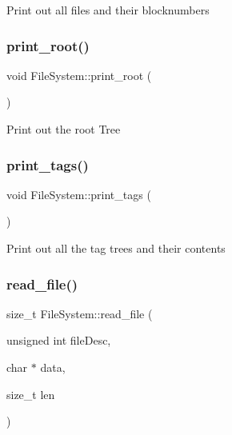 Print out all files and their blocknumbers \mbox{\label{class_file_system_a8ec00d561e8d7510358618b249cc60d1}} 
\subsubsection{\texorpdfstring{print\+\_\+root()}{print\_root()}}
{\footnotesize\ttfamily void File\+System\+::print\+\_\+root (\begin{DoxyParamCaption}{ }\end{DoxyParamCaption})}

Print out the root Tree \mbox{\label{class_file_system_ab76af13f044c3ca52e8503a9695685bd}} 
\subsubsection{\texorpdfstring{print\+\_\+tags()}{print\_tags()}}
{\footnotesize\ttfamily void File\+System\+::print\+\_\+tags (\begin{DoxyParamCaption}{ }\end{DoxyParamCaption})}

Print out all the tag trees and their contents \mbox{\label{class_file_system_aa8bf729b0bad79a4c2fda24c2d1def7f}} 
\subsubsection{\texorpdfstring{read\+\_\+file()}{read\_file()}}
{\footnotesize\ttfamily size\+\_\+t File\+System\+::read\+\_\+file (\begin{DoxyParamCaption}\item[{unsigned int}]{file\+Desc,  }\item[{char $\ast$}]{data,  }\item[{size\+\_\+t}]{len }\end{DoxyParamCaption})}


